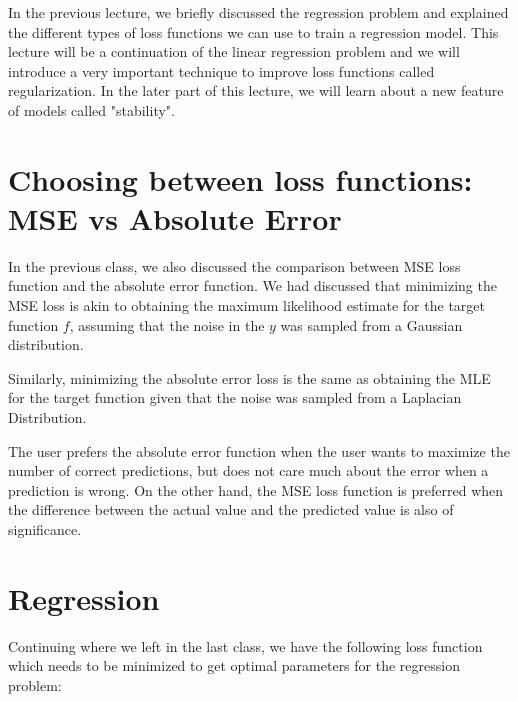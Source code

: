 \documentclass[12pt]{article}
\begin{document}
	\MakeScribeTop


\noindent In the previous lecture, we briefly discussed the regression problem and explained the different types of loss functions we can use to train a regression model. This lecture will be a continuation of the linear regression problem and we will introduce a very important technique to improve loss functions called regularization. In the later part of this lecture, we will learn about a new feature of models called "stability". 

\section{Choosing between loss functions: MSE vs Absolute Error}

In the previous class, we also discussed the comparison between MSE loss function and the absolute error function. We had discussed that minimizing the MSE loss is akin to obtaining the maximum likelihood estimate for the target function $f$, assuming that the noise in the $y$ was sampled from a Gaussian distribution. 


Similarly, minimizing the absolute error loss is the same as obtaining the MLE for the target function given that the noise was sampled from a Laplacian Distribution. 

The user prefers the absolute error function when the user wants to maximize the number of correct predictions, but does not care much about the error when a prediction is wrong. On the other hand, the MSE loss function is preferred when the difference between the actual value and the predicted value is also of significance.

\section{Regression}

Continuing where we left in the last class, we have the following loss function which needs to be minimized to get optimal parameters for the regression problem:
\end{document}
